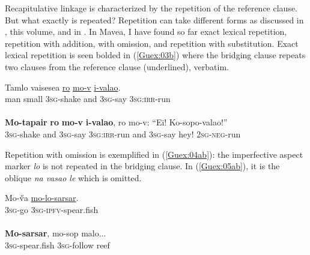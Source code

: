 \documentclass[output=paper]{LSP/langsci}
\begin{document}
Recapitulative linkage is characterized by the repetition of the reference clause. But what exactly is repeated? Repetition can take different forms as discussed in \citeauthor{guerin18}, this volume, and in \citet[][224]{brown.2000}. In Mavea, I have found so far exact lexical repetition, repetition with addition, with omission, and repetition with substitution.  Exact lexical repetition is seen bolded in (\ref{Guex:03b}) where the bridging clause repeats two clauses from the reference clause (underlined), verbatim. 

\begin{exe}
\ex \label{Guex:03ab}
\begin{xlist}
\ex \label{Guex:03a}
\gll Tamlo   vaisesea   \underline{}   \underline{ro}    \underline{mo-v}       \underline{i-valao}.\\
man     small      \textsc{3sg}-shake    and   \textsc{3sg}-say   \textsc{3sg}:\textsc{irr}-run\\
\glt {}\\
\ex \label{Guex:03b}
\gll \textbf{Mo-tapair}   \textbf{ro}     \textbf{mo-v}       \textbf{i-valao}, ro mo-v:     ``Ei!  Ko-sopo-valao!''\\     	       
    \textsc{3sg}-shake    and   \textsc{3sg}-say   \textsc{3sg:irr}-run    and \textsc{3sg}-say   hey!  \textsc{2sg-neg}-run\\
\glt {} 
\end{xlist}
\end{exe}

Repetition with omission is exemplified in (\ref{Guex:04ab}): the imperfective aspect marker \textit{lo} is not repeated in the bridging clause. In (\ref{Guex:05ab}), it is the oblique \textit{na vasao le} which is omitted.

\begin{exe}
\ex \label{Guex:04ab}
\begin{xlist}
\ex \label{Guex:04a}
\gll Mo-\H{v}a \underline{mo-lo-sarsar}.\\
\textsc{3sg}-go     \textsc{3sg}-\textsc{ipfv}-spear.fish\\
\glt {}\\
\ex \label{Guex:04b}
\gll \textbf{Mo-sarsar},   mo-sop         malo...\\     	       
    \textsc{3sg}-spear.fish    \textsc{3sg}-follow   reef \\
\glt {} 
\end{xlist}
\end{exe}
\end{document}
